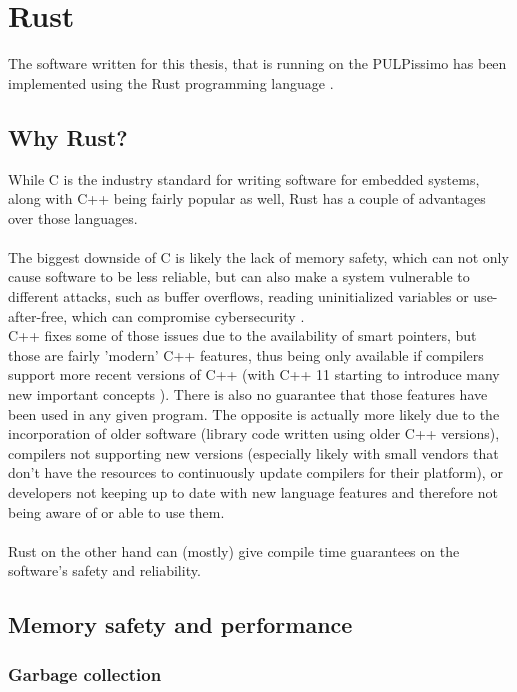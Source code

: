 \section{Rust}

The software written for this thesis, that is running on the PULPissimo \cite{pulpissimo} has been implemented using the Rust programming language \cite{rustlang}.

\subsection{Why Rust?}

While C is the industry standard for writing software for embedded systems, along with C++ being fairly popular as well, Rust has a couple of
advantages over those languages.\\\\
The biggest downside of C is likely the lack of memory safety, which can not only cause software to be less reliable, but
can also make a system vulnerable to different attacks, such as buffer overflows, reading uninitialized variables or use-after-free, which can compromise cybersecurity \cite{memory_safety}.\\
C++ fixes some of those issues due to the availability of smart pointers, but those are fairly 'modern' C++ features, thus being only available if compilers support more recent
versions of C++ (with C++ 11 starting to introduce many new important concepts \cite{cpp11}).
There is also no guarantee that those features have been used in any given program.
The opposite is actually more likely due to the incorporation of older software (library code written using older C++ versions),
compilers not supporting new versions (especially likely with small vendors that don't have the resources to continuously update compilers for their platform),
or developers not keeping up to date with new language features and therefore not being aware of or able to use them.\\\\
Rust on the other hand can (mostly) give compile time guarantees on the software's safety and reliability.

\newpage

\subsection{Memory safety and performance}

\subsubsection{Garbage collection}

